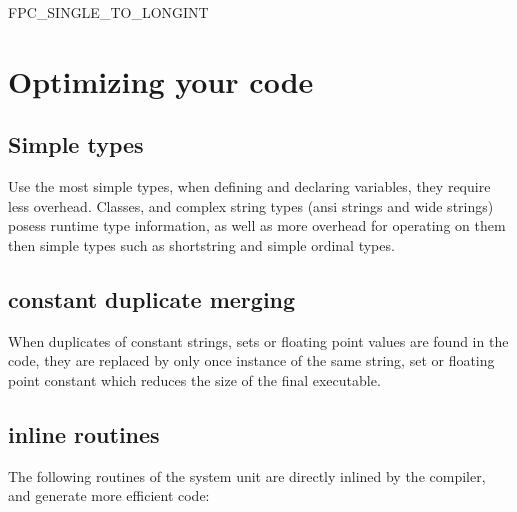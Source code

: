 \documentclass [a4paper,12pt]{article}
\begin{document}
FPC{\_}SINGLE{\_}TO{\_}LONGINT

\section{Optimizing your code}
\label{sec:optimizing}

\subsection{Simple types}
\label{subsec:simple}

Use the most simple types, when defining and declaring variables, they
require less overhead. Classes, and complex string types (ansi strings and
wide strings) posess runtime type information, as well as more overhead for
operating on them then simple types such as shortstring and simple ordinal
types.

\subsection{constant duplicate merging}
\label{subsec:constant}

When duplicates of constant strings, sets or floating point values are found
in the code, they are replaced by only once instance of the same string, set
or floating point constant which reduces the size of the final executable.

\subsection{inline routines}
\label{subsec:inline}

The following routines of the system unit are directly inlined by the
compiler, and generate more efficient code:
\end{document}
